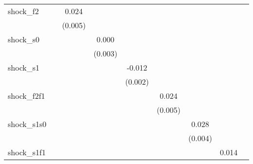 {\begin{tabular}{l*{8}{c}}
\addlinespace
shock\_f2    &                     &       0.024\sym{***}&                     &                     &                     &                     &                     &                     \\
            &                     &     (0.005)         &                     &                     &                     &                     &                     &                     \\
\addlinespace
shock\_s0    &                     &                     &       0.000         &                     &                     &                     &                     &                     \\
            &                     &                     &     (0.003)         &                     &                     &                     &                     &                     \\
\addlinespace
shock\_s1    &                     &                     &                     &      -0.012\sym{***}&                     &                     &                     &                     \\
            &                     &                     &                     &     (0.002)         &                     &                     &                     &                     \\
\addlinespace
shock\_f2f1  &                     &                     &                     &                     &       0.024\sym{***}&                     &                     &                     \\
            &                     &                     &                     &                     &     (0.005)         &                     &                     &                     \\
\addlinespace
shock\_s1s0  &                     &                     &                     &                     &                     &       0.028\sym{***}&                     &                     \\
            &                     &                     &                     &                     &                     &     (0.004)         &                     &                     \\
\addlinespace
shock\_s1f1  &                     &                     &                     &                     &                     &                     &       0.014\sym{***}&                     \\

\end{tabular}}
